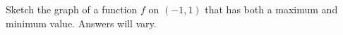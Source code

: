 {Sketch the graph of a function $f$ on $(-1,1)$ that has both a maximum and minimum value.
}
{Answers will vary.
}
